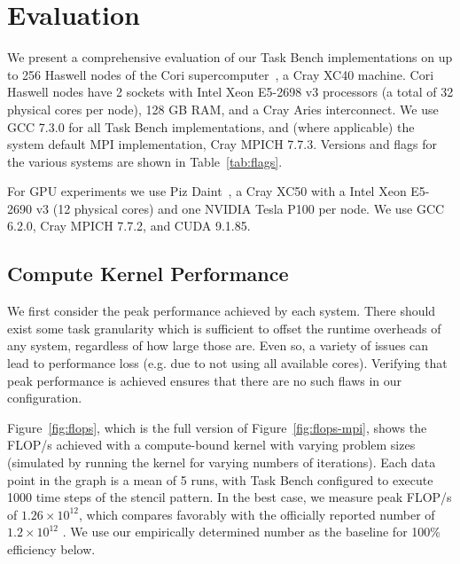 \section{Evaluation}
\label{sec:evaluation}

We present a comprehensive evaluation of our Task Bench implementations on up to 256
Haswell nodes of the Cori supercomputer~\cite{Cori}, a Cray XC40
machine. Cori Haswell nodes have 2 sockets with Intel Xeon E5-2698 v3
processors (a total of 32 physical cores per node), 128 GB RAM, and a
Cray Aries interconnect. We use GCC 7.3.0 for all Task Bench
implementations, and (where applicable) the system default MPI
implementation, Cray MPICH 7.7.3. Versions and flags for the
various systems are shown in Table~\ref{tab:flags}.







For GPU experiments we use Piz Daint~\cite{PizDaint}, a Cray XC50 with
a Intel Xeon E5-2690 v3 (12 physical cores) and one NVIDIA Tesla
P100 per node. We use GCC 6.2.0, Cray MPICH 7.7.2, and
CUDA 9.1.85.

\subsection{Compute Kernel Performance}
\label{subsec:peak-performance-and-efficiency}

We first consider the peak performance achieved by each system. There
should exist some task granularity which is sufficient to offset the
runtime overheads of any system, regardless of how large those
are. Even so, a variety of issues can lead to performance loss
(e.g. due to not using all available cores). Verifying that peak
performance is achieved ensures that there are no such flaws in our
configuration.

Figure~\ref{fig:flops}, which is the full version of
Figure~\ref{fig:flops-mpi}, shows the FLOP/s achieved with a compute-bound
kernel with varying problem sizes (simulated by running the kernel for varying numbers of iterations). Each data point in the graph is a mean of 5 runs, with Task Bench configured to execute 1000 time steps of the stencil pattern. In the best case, we measure peak FLOP/s of
$1.26 \times 10^{12}$, which compares favorably with the officially
reported number of $1.2 \times 10^{12}$ \cite{Cori}. We use our empirically determined number as
the baseline for 100\% efficiency below.

